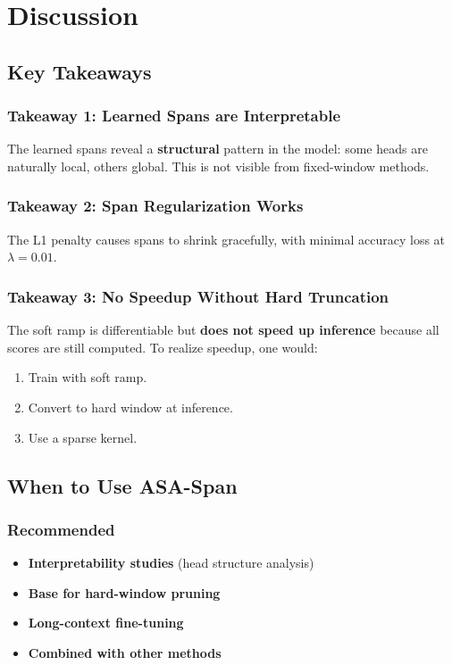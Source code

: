 
\section{Discussion}

\subsection{Key Takeaways}

\subsubsection{Takeaway 1: Learned Spans are Interpretable}

The learned spans reveal a \textbf{structural} pattern in the model: some heads 
are naturally local, others global. This is not visible from fixed-window 
methods.

\subsubsection{Takeaway 2: Span Regularization Works}

The L1 penalty causes spans to shrink gracefully, with minimal accuracy loss 
at $\lambda = 0.01$.

\subsubsection{Takeaway 3: No Speedup Without Hard Truncation}

The soft ramp is differentiable but \textbf{does not speed up inference} because 
all scores are still computed. To realize speedup, one would:
\begin{enumerate}
\item Train with soft ramp.
\item Convert to hard window at inference.
\item Use a sparse kernel.

\end{enumerate}
\subsection{When to Use ASA-Span}

\subsubsection{Recommended}

\begin{itemize}
\item \textbf{Interpretability studies} (head structure analysis)
\item \textbf{Base for hard-window pruning}
\item \textbf{Long-context fine-tuning}
\item \textbf{Combined with other methods}

\end{itemize}
